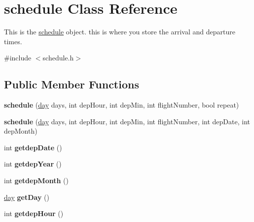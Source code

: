 \hypertarget{classschedule}{
\section{schedule Class Reference}
\label{classschedule}
}


This is the \hyperlink{classschedule}{schedule} object. this is where you store the arrival and departure times.  


{\ttfamily \#include $<$schedule.h$>$}\subsection*{Public Member Functions}
\begin{DoxyCompactItemize}
\item 
\hypertarget{classschedule_a7e2643447b03e5126dc5dcc27a2dcca4}{
{\bfseries schedule} (\hyperlink{classday}{day} days, int depHour, int depMin, int flightNumber, bool repeat)}
\label{classschedule_a7e2643447b03e5126dc5dcc27a2dcca4}

\item 
\hypertarget{classschedule_a93aebd49fc56f6e48f1e29905ead402c}{
{\bfseries schedule} (\hyperlink{classday}{day} days, int depHour, int depMin, int flightNumber, int depDate, int depMonth)}
\label{classschedule_a93aebd49fc56f6e48f1e29905ead402c}

\item 
\hypertarget{classschedule_a8fd090a01246197f1aaa4f9aac22671d}{
int {\bfseries getdepDate} ()}
\label{classschedule_a8fd090a01246197f1aaa4f9aac22671d}

\item 
\hypertarget{classschedule_a5e53f00c168370662c6db0709826c4e7}{
int {\bfseries getdepYear} ()}
\label{classschedule_a5e53f00c168370662c6db0709826c4e7}

\item 
\hypertarget{classschedule_a2099630112f0b4d299fe78de1eb1610e}{
int {\bfseries getdepMonth} ()}
\label{classschedule_a2099630112f0b4d299fe78de1eb1610e}

\item 
\hypertarget{classschedule_a32249b03e48030f45f9f75660d6f1ad7}{
\hyperlink{classday}{day} {\bfseries getDay} ()}
\label{classschedule_a32249b03e48030f45f9f75660d6f1ad7}

\item 
\hypertarget{classschedule_ac1e6bb6ba4cfd58fbf8d8eb7fe30e117}{
int {\bfseries getdepHour} ()}
\label{classschedule_ac1e6bb6ba4cfd58fbf8d8eb7fe30e117}


\end{DoxyCompactItemize}
